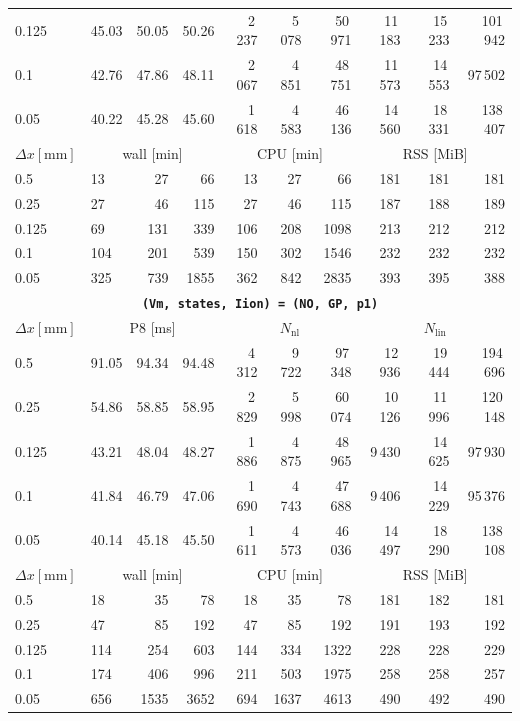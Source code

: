 \documentclass[11pt,a4paper]{article}
\newcommand{\code}[1]{\texttt{\small #1}}
\begin{document}
\begin{center}
\begin{longtable}{l|lrr|rrr|rrr}
0.125 & 45.03 & 50.05 & 50.26 & 2\,237 & 5\,078 & 50\,971 & 11\,183 & 15\,233 & 101\,942\\
0.1 & 42.76 & 47.86 & 48.11 & 2\,067 & 4\,851 & 48\,751 & 11\,573 & 14\,553 & 97\,502\\
0.05 & 40.22 & 45.28 & 45.60 & 1\,618 & 4\,583 & 46\,136 & 14\,560 & 18\,331 & 138\,407\\
\hline
$ \Delta x [\text{mm}] $ & \multicolumn{3}{c|}{wall [min]} & \multicolumn{3}{c|}{CPU [min]} & \multicolumn{3}{c|}{RSS [MiB]}\\
0.5 & 13 & 27 & 66 & 13 & 27 & 66 & 181 & 181 & 181\\
0.25 & 27 & 46 & 115 & 27 & 46 & 115 & 187 & 188 & 189\\
0.125 & 69 & 131 & 339 & 106 & 208 & 1098 & 213 & 212 & 212\\
0.1 & 104 & 201 & 539 & 150 & 302 & 1546 & 232 & 232 & 232\\
0.05 & 325 & 739 & 1855 & 362 & 842 & 2835 & 393 & 395 & 388\\
\hline
\hline
\multicolumn{10}{c}{\textbf{\code{(Vm, states, Iion) = (NO, GP, p1)}}}\\\hline
$ \Delta x [\text{mm}] $ & \multicolumn{3}{c|}{P8 [ms]} & \multicolumn{3}{c|}{$N_{\mathrm{nl}}$} & \multicolumn{3}{c|}{$N_{\mathrm{lin}}$}\\
0.5 & 91.05 & 94.34 & 94.48 & 4\,312 & 9\,722 & 97\,348 & 12\,936 & 19\,444 & 194\,696\\
0.25 & 54.86 & 58.85 & 58.95 & 2\,829 & 5\,998 & 60\,074 & 10\,126 & 11\,996 & 120\,148\\
0.125 & 43.21 & 48.04 & 48.27 & 1\,886 & 4\,875 & 48\,965 & 9\,430 & 14\,625 & 97\,930\\
0.1 & 41.84 & 46.79 & 47.06 & 1\,690 & 4\,743 & 47\,688 & 9\,406 & 14\,229 & 95\,376\\
0.05 & 40.14 & 45.18 & 45.50 & 1\,611 & 4\,573 & 46\,036 & 14\,497 & 18\,290 & 138\,108\\
\hline
$ \Delta x [\text{mm}] $ & \multicolumn{3}{c|}{wall [min]} & \multicolumn{3}{c|}{CPU [min]} & \multicolumn{3}{c|}{RSS [MiB]}\\
0.5 & 18 & 35 & 78 & 18 & 35 & 78 & 181 & 182 & 181\\
0.25 & 47 & 85 & 192 & 47 & 85 & 192 & 191 & 193 & 192\\
0.125 & 114 & 254 & 603 & 144 & 334 & 1322 & 228 & 228 & 229\\
0.1 & 174 & 406 & 996 & 211 & 503 & 1975 & 258 & 258 & 257\\
0.05 & 656 & 1535 & 3652 & 694 & 1637 & 4613 & 490 & 492 & 490\\

\end{longtable}
\end{center}
\end{document}
